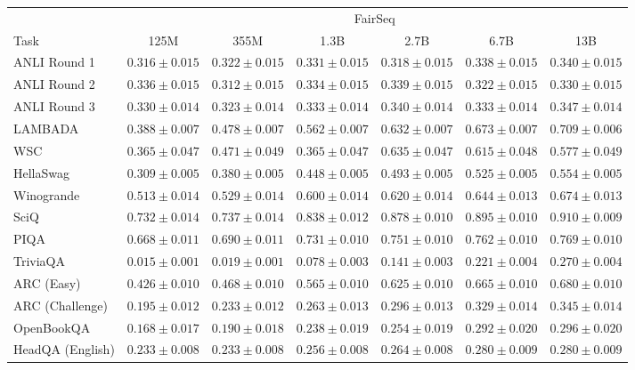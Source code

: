 \documentclass[11pt]{article}
\begin{document}
{\begin{landscape}
\begin{table}    
\centering 
\begin{tabular}{l c c c c c c }
 & \multicolumn{6}{c}{FairSeq} \\
 Task & 125M & 355M & 1.3B & 2.7B & 6.7B & 13B\\ \toprule
ANLI Round 1 & $0.316 \pm 0.015$ & $0.322 \pm 0.015$ & $0.331 \pm 0.015$ & $0.318 \pm 0.015$ & $0.338 \pm 0.015$ & $0.340 \pm 0.015$ \\ 
ANLI Round 2 & $0.336 \pm 0.015$ & $0.312 \pm 0.015$ & $0.334 \pm 0.015$ & $0.339 \pm 0.015$ & $0.322 \pm 0.015$ & $0.330 \pm 0.015$ \\ 
ANLI Round 3 & $0.330 \pm 0.014$ & $0.323 \pm 0.014$ & $0.333 \pm 0.014$ & $0.340 \pm 0.014$ & $0.333 \pm 0.014$ & $0.347 \pm 0.014$ \\ 
LAMBADA & $0.388 \pm 0.007$ & $0.478 \pm 0.007$ & $0.562 \pm 0.007$ & $0.632 \pm 0.007$ & $0.673 \pm 0.007$ & $0.709 \pm 0.006$ \\ 
WSC & $0.365 \pm 0.047$ & $0.471 \pm 0.049$ & $0.365 \pm 0.047$ & $0.635 \pm 0.047$ & $0.615 \pm 0.048$ & $0.577 \pm 0.049$ \\ 
HellaSwag & $0.309 \pm 0.005$ & $0.380 \pm 0.005$ & $0.448 \pm 0.005$ & $0.493 \pm 0.005$ & $0.525 \pm 0.005$ & $0.554 \pm 0.005$ \\ 
Winogrande & $0.513 \pm 0.014$ & $0.529 \pm 0.014$ & $0.600 \pm 0.014$ & $0.620 \pm 0.014$ & $0.644 \pm 0.013$ & $0.674 \pm 0.013$ \\ 
SciQ & $0.732 \pm 0.014$ & $0.737 \pm 0.014$ & $0.838 \pm 0.012$ & $0.878 \pm 0.010$ & $0.895 \pm 0.010$ & $0.910 \pm 0.009$ \\ 
PIQA & $0.668 \pm 0.011$ & $0.690 \pm 0.011$ & $0.731 \pm 0.010$ & $0.751 \pm 0.010$ & $0.762 \pm 0.010$ & $0.769 \pm 0.010$ \\ 
TriviaQA & $0.015 \pm 0.001$ & $0.019 \pm 0.001$ & $0.078 \pm 0.003$ & $0.141 \pm 0.003$ & $0.221 \pm 0.004$ & $0.270 \pm 0.004$ \\ 
ARC (Easy) & $0.426 \pm 0.010$ & $0.468 \pm 0.010$ & $0.565 \pm 0.010$ & $0.625 \pm 0.010$ & $0.665 \pm 0.010$ & $0.680 \pm 0.010$ \\ 
ARC (Challenge) & $0.195 \pm 0.012$ & $0.233 \pm 0.012$ & $0.263 \pm 0.013$ & $0.296 \pm 0.013$ & $0.329 \pm 0.014$ & $0.345 \pm 0.014$ \\ 
OpenBookQA & $0.168 \pm 0.017$ & $0.190 \pm 0.018$ & $0.238 \pm 0.019$ & $0.254 \pm 0.019$ & $0.292 \pm 0.020$ & $0.296 \pm 0.020$ \\ 
HeadQA (English) & $0.233 \pm 0.008$ & $0.233 \pm 0.008$ & $0.256 \pm 0.008$ & $0.264 \pm 0.008$ & $0.280 \pm 0.009$ & $0.280 \pm 0.009$ \\ 

\end{tabular}
\end{table}
\end{landscape}}
\end{document}

